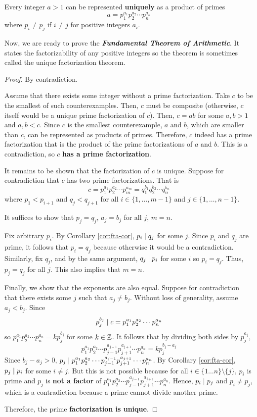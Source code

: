 \begin{theorem}
    Every integer $a > 1$ can be represented \textbf{uniquely} as a product of primes
    $$
    a = p_1^{a_1} p_2^{a_2} \cdots p_n^{a_n}
    $$
    where $p_i \neq p_j$ if $i \neq j$ for positive integers $a_i$.
\end{theorem}

Now, we are ready to prove the \textit{\textbf{Fundamental Theorem of Arithmetic}}. It states the factorizability of any positive integers so the theorem is sometimes called the unique factorization theorem.

\begin{proof}
    By contradiction.

    Assume that there exists some integer without a prime factorization. Take $c$ to be the smallest of such counterexamples. Then, $c$ must be composite (otherwise, $c$ itself would be a unique prime factorization of $c$). Then, $c = ab$ for some $a,b > 1$ and $a,b < c$. Since $c$ is the smallest counterexample, $a$ and $b$, which are smaller than $c$, can be represented as products of primes. Therefore, $c$ indeed has a prime factorization that is the product of the prime factorizations of $a$ and $b$. This is a contradiction, so $c$ \textbf{has a prime factorization}.

    It remains to be shown that the factorization of $c$ is unique. Suppose for contradiction that $c$ has two prime factorizations. That is
    $$
    c = p_1^{a_1} p_2^{a_2} \cdots p_m^{a_m} = q_1^{b_1} q_2^{b_2} \cdots q_n^{b_n}
    $$
    where $p_1 < p_{i+1}$ and $q_{j} < q_{j+1}$ for all $i \in \{1,\ldots,m-1\}$ and $j \in \{1,\ldots,n-1\}$.

    It suffices to show that $p_j = q_j$, $a_j = b_j$ for all $j$, $m = n$.
    
    Fix arbitrary $p_i$. By Corollary \ref{cor:fta-cor}, $p_i \mathrel{\mid} q_j$ for some $j$. Since $p_i$ and $q_j$ are prime, it follows that $p_i = q_j$ because otherwise it would be a contradiction. Similarly, fix $q_j$, and by the same argument, $q_j \mathrel{\mid} p_i$ for some $i$ so $p_i = q_j$. Thus, $p_j = q_j$ for all $j$. This also implies that $m = n$.

    Finally, we show that the exponents are also equal. Suppose for contradiction that there exists some $j$ such that $a_j \neq b_j$. Without loss of generality, assume $a_j < b_j$. Since
    $$
    p_j^{b_j} \mathrel{\mid} c = p_1^{a_1} p_2^{a_2} \cdots p_n^{a_n}
    $$
    so $p_1^{a_1} p_2^{a_2} \cdots p_n^{a_n} = k p_j^{b_j}$ for some $k \in \mathbb{Z}$. It follows that by dividing both sides by $p_j^{a_j}$,
    $$
    p_1^{a_1} p_2^{a_2} \cdots p_{j-1}^{a_{j-1}} p_{j+1}^{a_{j+1}} \cdots p_n^{a_n} = k p_{j}^{b_j - a_j}
    $$
    Since $b_j - a_j > 0$, $p_j \mathrel{\mid} p_1^{a_1} p_2^{a_2} \cdots p_{j-1}^{a_{j-1}} p_{j+1}^{a_{j+1}} \cdots p_n^{a_n}$. By Corollary \ref{cor:fta-cor}, $p_j \mathrel{\mid} p_i$ for some $i \neq j$. But this is not possible because for all $i \in \{1\ldots n\} \setminus \{j\}$, $p_i$ is prime and $p_j$ is \textbf{not a factor} of $p_1^{a_1} p_2^{a_2} \cdots p_{j-1}^{a_{j-1}} p_{j+1}^{a_{j+1}} \cdots p_n^{a_n}$. Hence, $p_i \mathrel{\mid} p_j$ and $p_i \neq p_j$, which is a contradiction because a prime cannot divide another prime.

    Therefore, the prime \textbf{factorization is unique}.
\end{proof}

